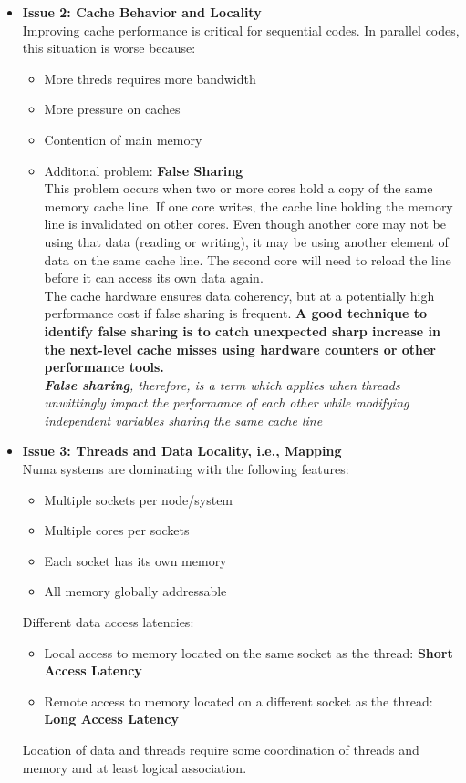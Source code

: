 \documentclass[12pt, a4paper]{report}
\begin{document}
\begin{itemize}
    \item {\bfseries{Issue 2: Cache Behavior and Locality}}\\
          Improving cache performance is critical for sequential codes. In parallel codes, this situation is worse because:
    \begin{itemize}
        \item More threds requires more bandwidth
        \item More pressure on caches
        \item Contention of main memory
        \item Additonal problem: {\bfseries{False Sharing}}\\
              This problem occurs when two or more cores hold a copy of the same memory cache line. If one core writes, the cache line holding the memory line 
              is invalidated on other cores. Even though another core may not be using that data (reading or writing), it may be using another element of data
              on the same cache line. The second core will need to reload the line before it can access its own data again.\\
              The cache hardware ensures data coherency, but at a potentially high performance cost if false sharing is frequent. {\bfseries{A good technique 
              to identify false sharing is to catch unexpected sharp increase in the next-level cache misses using hardware counters or other performance tools.}}
              \\{\textit{{\bfseries{False sharing}}, therefore, is a term which applies when threads unwittingly impact the performance of each other while
              modifying independent variables sharing the same cache line}}
    \end{itemize}

    \item {\bfseries{Issue 3: Threads and Data Locality, i.e., Mapping}}\\
    Numa systems are dominating with the following features:
    \begin{itemize}
        \item Multiple sockets per node/system
        \item Multiple cores per sockets
        \item Each socket has its own memory 
        \item All memory globally addressable
    \end{itemize}
    Different data access latencies:
    \begin{itemize}
        \item Local access to memory located on the same socket as the thread: {\bfseries{Short Access Latency}}
        \item Remote access to memory located on a different socket as the thread: {\bfseries{Long Access Latency}}
    \end{itemize}
    Location of data and threads require some coordination of threads and memory and at least logical association.\\


\end{itemize}
\end{document}
